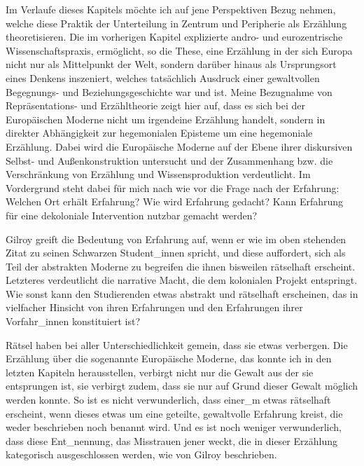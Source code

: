 Im Verlaufe dieses Kapitels möchte ich auf jene Perspektiven Bezug nehmen,
welche diese Praktik der Unterteilung in Zentrum und Peripherie als Erzählung
theoretisieren. Die im vorherigen Kapitel explizierte andro- und eurozentrische
Wissenschaftspraxis, ermöglicht, so die These, eine Erzählung in der sich
Europa nicht nur als Mittelpunkt der Welt, sondern darüber hinaus als
Ursprungsort eines Denkens inszeniert, welches tatsächlich Ausdruck einer
gewaltvollen Begegnungs- und Beziehungsgeschichte war und ist. Meine
Bezugnahme von Repräsentations- und Erzähltheorie zeigt hier auf, dass es sich
bei der Europäischen Moderne nicht um irgendeine Erzählung handelt, sondern in
direkter Abhängigkeit zur hegemonialen Episteme um eine hegemoniale Erzählung.
Dabei wird die Europäische Moderne auf der Ebene ihrer diskursiven Selbst- und
Außenkonstruktion untersucht und der Zusammenhang bzw. die Verschränkung von
Erzählung und Wissensproduktion verdeutlicht. Im Vordergrund steht dabei für
mich nach wie vor die Frage nach der Erfahrung: Welchen Ort erhält Erfahrung?
Wie wird Erfahrung gedacht? Kann Erfahrung für eine dekoloniale Intervention
nutzbar gemacht werden?

Gilroy greift die Bedeutung von Erfahrung auf, wenn er wie im oben stehenden
Zitat zu seinen Schwarzen Student\_innen spricht, und diese auffordert, sich als
Teil der \glqq abstrakten Moderne \grqq \footnotemark {} zu begreifen die ihnen bisweilen \glqq rätselhaft
\grqq \footnotemark {}
erscheint. Letzteres verdeutlicht die narrative Macht, die dem kolonialen
Projekt entspringt. Wie sonst kann den Studierenden etwas abstrakt und
rätselhaft erscheinen, das in vielfacher Hinsicht von ihren Erfahrungen und den
Erfahrungen ihrer Vorfahr\_innen konstituiert ist? 

Rätsel haben bei aller Unterschiedlichkeit gemein, dass sie etwas verbergen.
Die Erzählung über die sogenannte Europäische Moderne, das konnte ich in den
letzten Kapiteln herausstellen, verbirgt nicht nur die Gewalt aus der sie
entsprungen ist, sie verbirgt zudem, dass sie nur auf Grund dieser Gewalt
möglich werden konnte. So ist es nicht verwunderlich, dass einer\_m etwas
rätselhaft erscheint, wenn dieses etwas um eine geteilte, gewaltvolle Erfahrung
kreist, die weder beschrieben noch benannt wird. Und es ist noch weniger
verwunderlich, dass diese Ent\_nennung, das Misstrauen jener weckt, die in
dieser Erzählung kategorisch ausgeschlossen werden, wie von Gilroy beschrieben.

